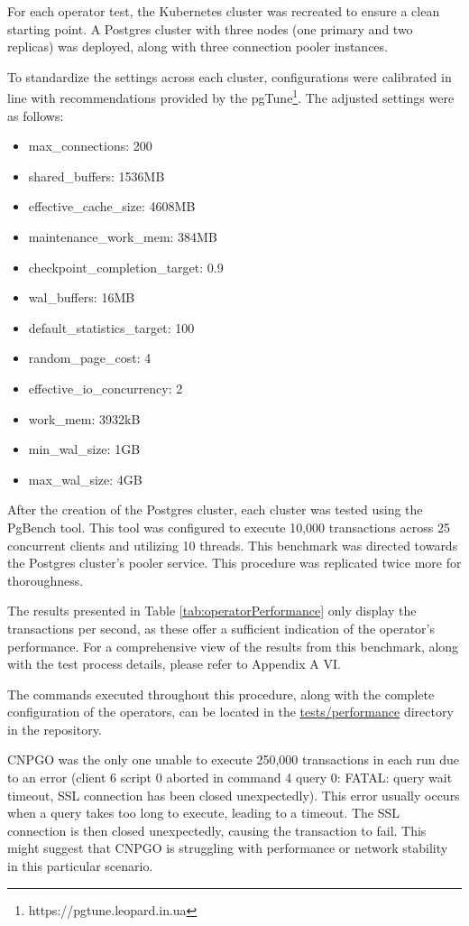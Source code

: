 For each operator test, the Kubernetes cluster was recreated to ensure a clean starting point. A Postgres cluster with three nodes (one primary and two replicas) was deployed, along with three connection pooler instances.

To standardize the settings across each cluster, configurations were calibrated in line with recommendations provided by the pgTune\footnote[7]{https://pgtune.leopard.in.ua}. The adjusted settings were as follows:
\begin{itemize}
    \item max\_connections: 200
    \item shared\_buffers: 1536MB
    \item effective\_cache\_size: 4608MB
    \item maintenance\_work\_mem: 384MB
    \item checkpoint\_completion\_target: 0.9
    \item wal\_buffers: 16MB
    \item default\_statistics\_target: 100
    \item random\_page\_cost: 4
    \item effective\_io\_concurrency: 2
    \item work\_mem: 3932kB
    \item min\_wal\_size: 1GB
    \item max\_wal\_size: 4GB
\end{itemize}

After the creation of the Postgres cluster, each cluster was tested using the PgBench tool. This tool was configured to execute 10,000 transactions across 25 concurrent clients and utilizing 10 threads. This benchmark was directed towards the Postgres cluster's pooler service. This procedure was replicated twice more for thoroughness.

The results presented in Table \ref{tab:operatorPerformance} only display the transactions per second, as these offer a sufficient indication of the operator's performance. For a comprehensive view of the results from this benchmark, along with the test process details, please refer to Appendix A VI.

The commands executed throughout this procedure, along with the complete configuration of the operators, can be located in the \url{tests/performance} directory in the repository.

CNPGO was the only one unable to execute 250,000 transactions in each run due to an error (client 6 script 0 aborted in command 4 query 0: FATAL: query wait timeout, SSL connection has been closed unexpectedly).
This error usually occurs when a query takes too long to execute, leading to a timeout. The SSL connection is then closed unexpectedly, causing the transaction to fail. This might suggest that CNPGO is struggling with performance or network stability in this particular scenario.

